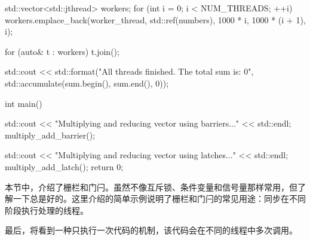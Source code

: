 \begin{cpp}
{    std::vector<std::jthread> workers;
    for (int i = 0; i < NUM_THREADS; ++i) {
        workers.emplace_back(worker_thread, std::ref(numbers), 1000 *
        i, 1000 * (i + 1), i);
    }

    for (auto& t : workers) {
        t.join();
    }

    std::cout << std::format("All threads finished. The total sum is: {0}\n",
    std::accumulate(sum.begin(), sum.end(), 0));
}

int main() {
    std::cout << "Multiplying and reducing vector using barriers..." << std::endl;
    multiply_add_barrier();

    std::cout << "Multiplying and reducing vector using latches..." << std::endl;
    multiply_add_latch();
    return 0;
}
\end{cpp}

本节中，介绍了栅栏和门闩。虽然不像互斥锁、条件变量和信号量那样常用，但了解一下总是好的。这里介绍的简单示例说明了栅栏和门闩的常见用途：同步在不同阶段执行处理的线程。

最后，将看到一种只执行一次代码的机制，该代码会在不同的线程中多次调用。

























